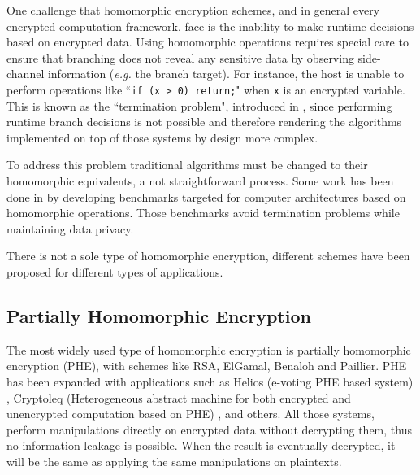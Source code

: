 One challenge that homomorphic encryption schemes, and in general every encrypted computation framework, face is the inability to make runtime decisions based on encrypted data.
Using homomorphic operations requires special care to ensure that branching does not reveal any sensitive data by observing side-channel information (\textit{e.g.} the branch target).
For instance, the host is unable to perform operations like ``\texttt{if (x > 0) return;}" when \texttt{x} is an encrypted variable.
This is known as the ``termination problem", introduced in \cite{brenner2011secret}, since performing runtime branch decisions is not possible and therefore rendering the algorithms implemented on top of those systems by design more complex.


To address this problem traditional algorithms must be changed to their homomorphic equivalents, a not straightforward process.
Some work has been done in \cite{mouris2018terminator} by developing benchmarks targeted for computer architectures based on homomorphic operations.
Those benchmarks avoid termination problems while maintaining data privacy.


There is not a sole type of homomorphic encryption, different schemes have been proposed for different types of applications.


\subsection{Partially Homomorphic Encryption}\label{ss:phe}
The most widely used type of homomorphic encryption is partially homomorphic encryption (PHE), with schemes like RSA, ElGamal, Benaloh and Paillier.
PHE has been expanded with applications such as Helios (e-voting PHE based system) \cite{adida2008helios}, Cryptoleq (Heterogeneous abstract machine for both encrypted and unencrypted computation based on PHE) \cite{mazonka2016cryptoleq}, and others.
All those systems, perform manipulations directly on encrypted data without decrypting them, thus no information leakage is possible.
When the result is eventually decrypted, it will be the same as applying the same manipulations on plaintexts.

